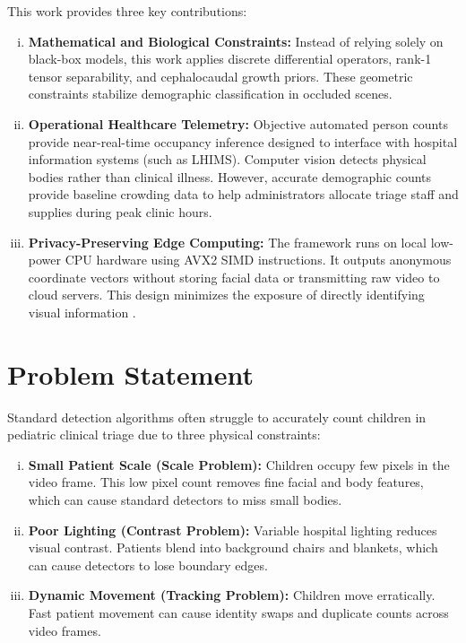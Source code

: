 This work provides three key contributions:
\begin{enumerate}[(i)]
    \item \textbf{Mathematical and Biological Constraints:} Instead of relying solely on black-box models, this work applies discrete differential operators, rank-1 tensor separability, and cephalocaudal growth priors. These geometric constraints stabilize demographic classification in occluded scenes.
    \item \textbf{Operational Healthcare Telemetry:} Objective automated person counts provide near-real-time occupancy inference designed to interface with hospital information systems (such as LHIMS). Computer vision detects physical bodies rather than clinical illness. However, accurate demographic counts provide baseline crowding data to help administrators allocate triage staff and supplies during peak clinic hours.
    \item \textbf{Privacy-Preserving Edge Computing:} The framework runs on local low-power CPU hardware using AVX2 SIMD instructions. It outputs anonymous coordinate vectors without storing facial data or transmitting raw video to cloud servers. This design minimizes the exposure of directly identifying visual information \cite{milkaite2019}.
\end{enumerate}

\section{Problem Statement}
Standard detection algorithms often struggle to accurately count children in pediatric clinical triage due to three physical constraints:
\begin{enumerate}[(i)]
    \item \textbf{Small Patient Scale (Scale Problem):} Children occupy few pixels in the video frame. This low pixel count removes fine facial and body features, which can cause standard detectors to miss small bodies.
    \item \textbf{Poor Lighting (Contrast Problem):} Variable hospital lighting reduces visual contrast. Patients blend into background chairs and blankets, which can cause detectors to lose boundary edges.
    \item \textbf{Dynamic Movement (Tracking Problem):} Children move erratically. Fast patient movement can cause identity swaps and duplicate counts across video frames.
\end{enumerate}

